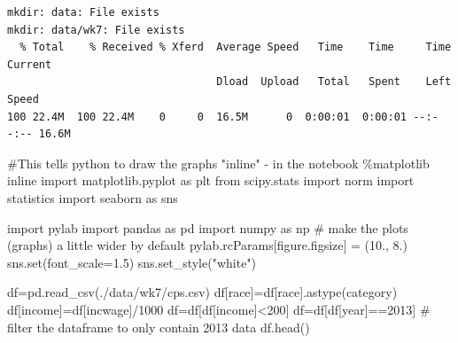 \documentclass[
  letterpaper,
  DIV=11,
  numbers=noendperiod]{scrreprt}
\newenvironment{Shaded}{\begin{snugshade}}{\end{snugshade}}
\newcommand{\BuiltInTok}[1]{\textcolor[rgb]{0.00,0.23,0.31}{#1}}
\newcommand{\CommentTok}[1]{\textcolor[rgb]{0.37,0.37,0.37}{#1}}
\newcommand{\DecValTok}[1]{\textcolor[rgb]{0.68,0.00,0.00}{#1}}
\newcommand{\FloatTok}[1]{\textcolor[rgb]{0.68,0.00,0.00}{#1}}
\newcommand{\ImportTok}[1]{\textcolor[rgb]{0.00,0.46,0.62}{#1}}
\newcommand{\NormalTok}[1]{\textcolor[rgb]{0.00,0.23,0.31}{#1}}
\newcommand{\OperatorTok}[1]{\textcolor[rgb]{0.37,0.37,0.37}{#1}}
\newcommand{\StringTok}[1]{\textcolor[rgb]{0.13,0.47,0.30}{#1}}
\begin{document}
\begin{verbatim}
mkdir: data: File exists
mkdir: data/wk7: File exists
  % Total    % Received % Xferd  Average Speed   Time    Time     Time  Current
                                 Dload  Upload   Total   Spent    Left  Speed
100 22.4M  100 22.4M    0     0  16.5M      0  0:00:01  0:00:01 --:--:-- 16.6M
\end{verbatim}

\begin{Shaded}
\begin{Highlighting}[]
\CommentTok{\#This tells python to draw the graphs "inline" {-} in the notebook}
\OperatorTok{\%}\NormalTok{matplotlib inline  }
\ImportTok{import}\NormalTok{ matplotlib.pyplot }\ImportTok{as}\NormalTok{ plt}
\ImportTok{from}\NormalTok{ scipy.stats }\ImportTok{import}\NormalTok{ norm}
\ImportTok{import}\NormalTok{ statistics}
\ImportTok{import}\NormalTok{ seaborn }\ImportTok{as}\NormalTok{ sns}

\ImportTok{import}\NormalTok{ pylab}
\ImportTok{import}\NormalTok{ pandas }\ImportTok{as}\NormalTok{ pd}
\ImportTok{import}\NormalTok{ numpy }\ImportTok{as}\NormalTok{ np}
\CommentTok{\# make the plots (graphs) a little wider by default}
\NormalTok{pylab.rcParams[}\StringTok{\textquotesingle{}figure.figsize\textquotesingle{}}\NormalTok{] }\OperatorTok{=}\NormalTok{ (}\FloatTok{10.}\NormalTok{, }\FloatTok{8.}\NormalTok{)}
\NormalTok{sns.}\BuiltInTok{set}\NormalTok{(font\_scale}\OperatorTok{=}\FloatTok{1.5}\NormalTok{)}
\NormalTok{sns.set\_style(}\StringTok{"white"}\NormalTok{)}
\end{Highlighting}
\end{Shaded}

\begin{Shaded}
\begin{Highlighting}[]
\NormalTok{df}\OperatorTok{=}\NormalTok{pd.read\_csv(}\StringTok{\textquotesingle{}./data/wk7/cps.csv\textquotesingle{}}\NormalTok{)}
\NormalTok{df[}\StringTok{\textquotesingle{}race\textquotesingle{}}\NormalTok{]}\OperatorTok{=}\NormalTok{df[}\StringTok{\textquotesingle{}race\textquotesingle{}}\NormalTok{].astype(}\StringTok{\textquotesingle{}category\textquotesingle{}}\NormalTok{)}
\NormalTok{df[}\StringTok{\textquotesingle{}income\textquotesingle{}}\NormalTok{]}\OperatorTok{=}\NormalTok{df[}\StringTok{\textquotesingle{}incwage\textquotesingle{}}\NormalTok{]}\OperatorTok{/}\DecValTok{1000}
\NormalTok{df}\OperatorTok{=}\NormalTok{df[df[}\StringTok{\textquotesingle{}income\textquotesingle{}}\NormalTok{]}\OperatorTok{\textless{}}\DecValTok{200}\NormalTok{]}
\NormalTok{df}\OperatorTok{=}\NormalTok{df[df[}\StringTok{\textquotesingle{}year\textquotesingle{}}\NormalTok{]}\OperatorTok{==}\DecValTok{2013}\NormalTok{] }\CommentTok{\# filter the dataframe to only contain 2013 data}
\NormalTok{df.head()}
\end{Highlighting}
\end{Shaded}
\end{document}
